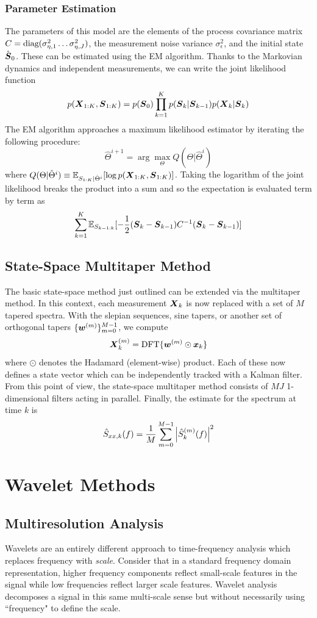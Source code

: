 \documentclass[twocolumn]{gwclass}
\begin{document}
\subsubsection{Parameter Estimation}
The parameters of this model are the elements of the process covariance matrix $C=\text{\normalfont{diag}}(\sigma^2_{\eta,1}\dots \sigma^2_{\eta,J})$, the measurement noise variance $\sigma_\epsilon^2$, and the initial state $\hat{\boldsymbol{S}}_0$. These can be estimated using the EM algorithm. Thanks to the Markovian dynamics and independent measurements, we can write the joint likelihood function
$$ p(\boldsymbol{X}_{1:K},\boldsymbol{S}_{1:K}) = p(\boldsymbol{S}_0)\prod_{k=1}^K p(\boldsymbol{S}_k|\boldsymbol{S}_{k-1})p(\boldsymbol{X}_k|\boldsymbol{S}_k) $$
The EM algorithm approaches a maximum likelihood estimator by iterating the following procedure:
$$ \hat{\Theta}^{i+1}=\arg\max_\Theta Q(\Theta|\hat\Theta^i) $$
where $ Q(\Theta|\hat\Theta^i)\equiv \mathbb{E}_{S_{1:K}|\hat\Theta^i}[\log p(\boldsymbol{X}_{1:K},\boldsymbol{S}_{1:K})] $. Taking the logarithm of the joint likelihood breaks the product into a sum and so the expectation is evaluated term by term as
$$ \sum_{k=1}^K\mathbb{E}_{S_{k-1:k}}[-\frac{1}{2}(\boldsymbol{S}_k-\boldsymbol{S}_{k-1})C^{-1}(\boldsymbol{S}_k-\boldsymbol{S}_{k-1})] $$

\subsection{State-Space Multitaper Method}
The basic state-space method just outlined can be extended via the multitaper method. In this context, each measurement $\boldsymbol{X}_k$ is now replaced with a set of $M$ tapered spectra. With the slepian sequences, sine tapers, or another set of orthogonal tapers $\{\boldsymbol{w}^{(m)}\}_{m=0}^{M-1}$, we compute
$$\boldsymbol{X}_k^{(m)}=\text{\normalfont{DFT}}\{\boldsymbol{w}^{(m)}\odot \boldsymbol{x}_k\}$$
where $\odot$ denotes the Hadamard (element-wise) product. Each of these now defines a state vector which can be independently tracked with a Kalman filter. From this point of view, the state-space multitaper method consists of $MJ$ 1-dimensional filters acting in parallel. Finally, the estimate for the spectrum at time $k$ is 
$$ \hat{S}_{xx,k}(f) = \frac{1}{M}\sum_{m=0}^{M-1} \abs{\hat{S}_k^{(m)}(f)}^2 $$


\section{Wavelet Methods}
\subsection{Multiresolution Analysis}
Wavelets are an entirely different approach to time-frequency analysis which replaces frequency with \emph{scale}. Consider that in a standard frequency domain representation, higher frequency components reflect small-scale features in the signal while low frequencies reflect larger scale features. Wavelet analysis decomposes a signal in this same multi-scale sense but without necessarily using ``frequency" to define the scale. 
\end{document}
